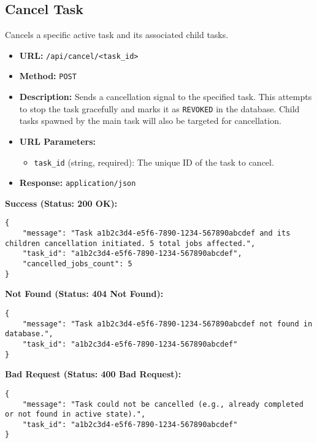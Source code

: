 \documentclass{article}
\begin{document}
\subsection{Cancel Task}
Cancels a specific active task and its associated child tasks.
\begin{itemize}[noitemsep]
    \item \textbf{URL:} \verb|/api/cancel/<task_id>|
    \item \textbf{Method:} \texttt{POST}
    \item \textbf{Description:} Sends a cancellation signal to the specified task. This attempts to stop the task gracefully and marks it as \texttt{REVOKED} in the database. Child tasks spawned by the main task will also be targeted for cancellation.
    \item \textbf{URL Parameters:}
    \begin{itemize}[noitemsep]
        \item \texttt{task\_id} (string, required): The unique ID of the task to cancel.
    \end{itemize}
    \item \textbf{Response:} \texttt{application/json}
\end{itemize}

\textbf{Success (Status: 200 OK):}
\lstset{language=json, caption=Example Response: Cancel Task (Success)}
\begin{lstlisting}
{
    "message": "Task a1b2c3d4-e5f6-7890-1234-567890abcdef and its children cancellation initiated. 5 total jobs affected.",
    "task_id": "a1b2c3d4-e5f6-7890-1234-567890abcdef",
    "cancelled_jobs_count": 5
}
\end{lstlisting}

\textbf{Not Found (Status: 404 Not Found):}
\lstset{language=json, caption=Example Response: Cancel Task (Not Found)}
\begin{lstlisting}
{
    "message": "Task a1b2c3d4-e5f6-7890-1234-567890abcdef not found in database.",
    "task_id": "a1b2c3d4-e5f6-7890-1234-567890abcdef"
}
\end{lstlisting}

\textbf{Bad Request (Status: 400 Bad Request):}
\lstset{language=json, caption=Example Response: Cancel Task (Bad Request)}
\begin{lstlisting}
{
    "message": "Task could not be cancelled (e.g., already completed or not found in active state).",
    "task_id": "a1b2c3d4-e5f6-7890-1234-567890abcdef"
}
\end{lstlisting}
\end{document}
